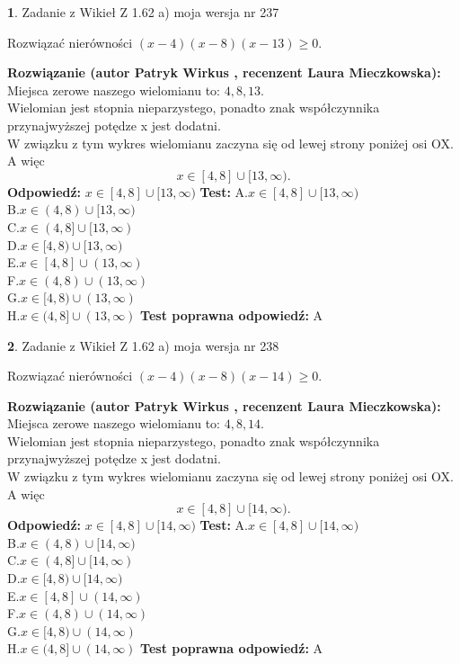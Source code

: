 \documentclass[12pt, a4paper]{article}
\theoremstyle{definition} %
\newtheorem{zad}{}
\newcommand{\zadStart}[1]{\begin{zad}#1\newline}
\newcommand{\zadStop}{\end{zad}}
\newcommand{\rozwStart}[2]{\noindent \textbf{Rozwiązanie (autor #1 , recenzent #2): }\newline}
\newcommand{\rozwStop}{\newline}
\newcommand{\odpStart}{\noindent \textbf{Odpowiedź:}\newline}
\newcommand{\odpStop}{\newline}
\newcommand{\testStart}{\noindent \textbf{Test:}\newline}
\newcommand{\testStop}{\newline}
\newcommand{\kluczStart}{\noindent \textbf{Test poprawna odpowiedź:}\newline}
\newcommand{\kluczStop}{\newline}
\begin{document}
\zadStart{Zadanie z Wikieł Z 1.62 a) moja wersja nr 237}

Rozwiązać nierówności $(x-4)(x-8)(x-13)\ge0$.
\zadStop
\rozwStart{Patryk Wirkus}{Laura Mieczkowska}
Miejsca zerowe naszego wielomianu to: $4, 8, 13$.\\
Wielomian jest stopnia nieparzystego, ponadto znak współczynnika przy\linebreak najwyższej potędze x jest dodatni.\\ W związku z tym wykres wielomianu zaczyna się od lewej strony poniżej osi OX. A więc $$x \in [4,8] \cup [13,\infty).$$
\rozwStop
\odpStart
$x \in [4,8] \cup [13,\infty)$
\odpStop
\testStart
A.$x \in [4,8] \cup [13,\infty)$\\
B.$x \in (4,8) \cup [13,\infty)$\\
C.$x \in (4,8] \cup [13,\infty)$\\
D.$x \in [4,8) \cup [13,\infty)$\\
E.$x \in [4,8] \cup (13,\infty)$\\
F.$x \in (4,8) \cup (13,\infty)$\\
G.$x \in [4,8) \cup (13,\infty)$\\
H.$x \in (4,8] \cup (13,\infty)$
\testStop
\kluczStart
A
\kluczStop



\zadStart{Zadanie z Wikieł Z 1.62 a) moja wersja nr 238}

Rozwiązać nierówności $(x-4)(x-8)(x-14)\ge0$.
\zadStop
\rozwStart{Patryk Wirkus}{Laura Mieczkowska}
Miejsca zerowe naszego wielomianu to: $4, 8, 14$.\\
Wielomian jest stopnia nieparzystego, ponadto znak współczynnika przy\linebreak najwyższej potędze x jest dodatni.\\ W związku z tym wykres wielomianu zaczyna się od lewej strony poniżej osi OX. A więc $$x \in [4,8] \cup [14,\infty).$$
\rozwStop
\odpStart
$x \in [4,8] \cup [14,\infty)$
\odpStop
\testStart
A.$x \in [4,8] \cup [14,\infty)$\\
B.$x \in (4,8) \cup [14,\infty)$\\
C.$x \in (4,8] \cup [14,\infty)$\\
D.$x \in [4,8) \cup [14,\infty)$\\
E.$x \in [4,8] \cup (14,\infty)$\\
F.$x \in (4,8) \cup (14,\infty)$\\
G.$x \in [4,8) \cup (14,\infty)$\\
H.$x \in (4,8] \cup (14,\infty)$
\testStop
\kluczStart
A
\kluczStop
\end{document}
